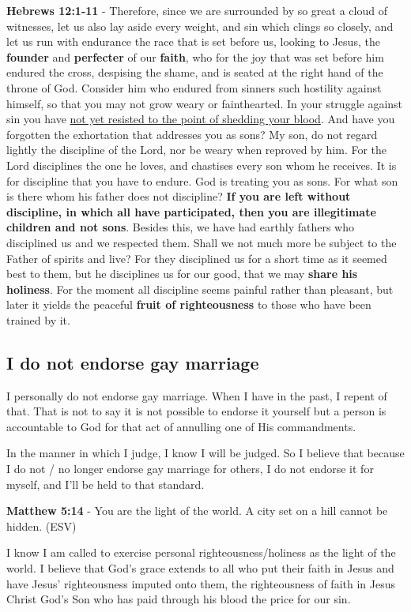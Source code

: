 \documentclass[11pt]{article}
\begin{document}
\textbf{Hebrews 12:1-11} - Therefore, since we are surrounded by so great a cloud of witnesses, let us also lay aside every weight, and sin which clings so closely, and let us run with endurance the race that is set before us, looking to Jesus, the \textbf{founder} and \textbf{perfecter} of our \textbf{faith}, who for the joy that was set before him endured the cross, despising the shame, and is seated at the right hand of the throne of God.  Consider him who endured from sinners such hostility against himself, so that you may not grow weary or fainthearted.  In your struggle against sin you have \uline{not yet resisted to the point of shedding your blood}.  And have you forgotten the exhortation that addresses you as sons? My son, do not regard lightly the discipline of the Lord, nor be weary when reproved by him.  For the Lord disciplines the one he loves, and chastises every son whom he receives.  It is for discipline that you have to endure. God is treating you as sons. For what son is there whom his father does not discipline?  \textbf{If you are left without discipline, in which all have participated, then you are illegitimate children and not sons}.  Besides this, we have had earthly fathers who disciplined us and we respected them. Shall we not much more be subject to the Father of spirits and live?  For they disciplined us for a short time as it seemed best to them, but he disciplines us for our good, that we may \textbf{share his holiness}.  For the moment all discipline seems painful rather than pleasant, but later it yields the peaceful \textbf{fruit of righteousness} to those who have been trained by it.

\subsection{I do not endorse gay marriage}
\label{sec:org1945f48}
I personally do not endorse gay marriage. When I have in the past, I repent of that. That is not to say it is not possible to endorse it yourself but a person is accountable to God for that act of annulling one of His commandments.

In the manner in which I judge, I know I will be judged. So I believe that because I do not / no longer endorse gay marriage for others, I do not endorse it for myself, and I'll be held to that standard.

\textbf{Matthew 5:14} - You are the light of the world.  A city set on a hill cannot be hidden.  (ESV)

I know I am called to exercise personal righteousness/holiness as the light of the world. I believe that God's grace extends to all who put their faith in Jesus and have Jesus' righteousness imputed onto them, the righteousness of faith in Jesus Christ God's Son who has paid through his blood the price for our sin.
\end{document}

